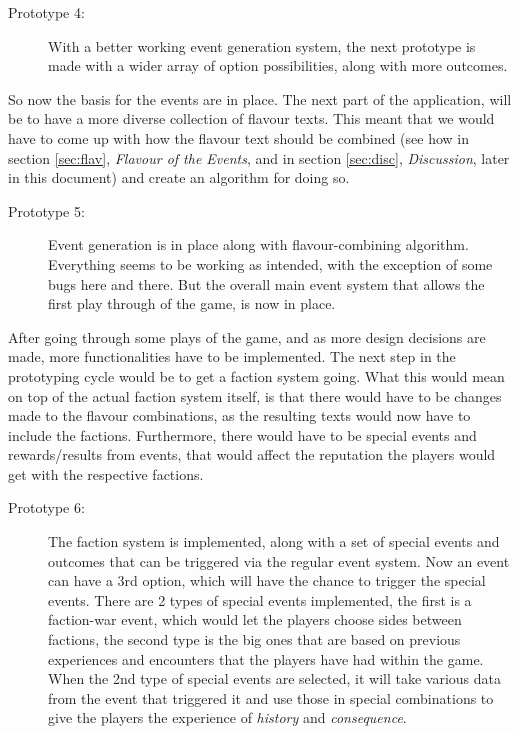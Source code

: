 \begin{description}
\item[Prototype 4:] With a better working event generation system, the next prototype is made with a wider array of option possibilities, along with more outcomes.
\end{description}

So now the basis for the events are in place. The next part of the application, will be to have a more diverse collection of flavour texts.
This meant that we would have to come up with how the flavour text should be combined (see how in section \ref{sec:flav}, \textit{Flavour of the Events}, and in section \ref{sec:disc}, \textit{Discussion}, later in this document) and create an algorithm for doing so. 

\begin{description}
\item[Prototype 5:] Event generation is in place along with flavour-combining algorithm. Everything seems to be working as intended, with the exception of some bugs here and there. But the overall main event system that allows the first play through of the game, is now in place.
\end{description}

After going through some plays of the game, and as more design decisions are made, more functionalities have to be implemented. The next step in the prototyping cycle would be to get a faction system going. What this would mean on top of the actual faction system itself, is that there would have to be changes made to the flavour combinations, as the resulting texts would now have to include the factions. Furthermore, there would have to be special events and rewards/results from events, that would affect the reputation the players would get with the respective factions.

\begin{description}
\item[Prototype 6:]
The faction system is implemented, along with a set of special events and outcomes that can be triggered via the regular event system. Now an event can have a 3rd option, which will have the chance to trigger the special events. There are 2 types of special events implemented, the first is a faction-war event, which would let the players choose sides between factions, the second type is the big ones that are based on previous experiences and encounters that the players have had within the game. When the 2nd type of special events are selected, it will take various data from the event that triggered it and use those in special combinations to give the players the experience of \textit{history} and \textit{consequence}.
\end{description}

